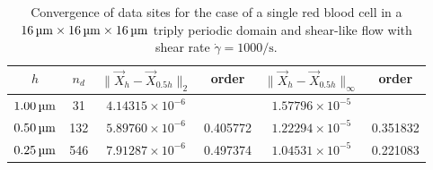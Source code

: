 \begin{table}
    \begin{center}
        \begingroup
        \setlength{\tabcolsep}{9pt}
        \renewcommand{\arraystretch}{1.5}
        \begin{tabular}{cc|cc|cc}
                                                                                                                                  \\ \toprule
            $h$       & $n_d$ &  $\|\vec{X}_h-\vec{X}_{0.5h}\|_2$ & order    & $\|\vec{X}_h-\vec{X}_{0.5h}\|_{\infty}$ & order    \\ \midrule
            $1.00\um$ & 31    &  $4.14315\times10^{-6}$           &          & $1.57796\times10^{-5}$                  &          \\
            $0.50\um$ & 132   &  $5.89760\times10^{-6}$           & 0.405772 & $1.22294\times10^{-5}$                  & 0.351832 \\
            $0.25\um$ & 546   &  $7.91287\times10^{-6}$           & 0.497374 & $1.04531\times10^{-5}$                  & 0.221083 \\ \bottomrule
        \end{tabular}
        \endgroup
    \end{center}
    \caption{%
        Convergence of data sites for the case of a single red blood cell in a
        $16\um\times16\um\times16\um$ triply periodic domain and shear-like
        flow with shear rate $\dot{\gamma} = 1000\si{\per\second}$.
    }
\end{table}
